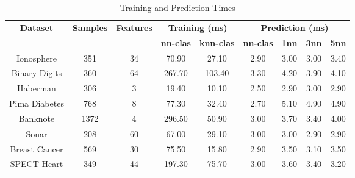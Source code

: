 \begin{table}[H]
\centering
\begin{tabular}{|c|c|c|c|c|c|c|c|c|}
\hline
\multirow{2}{*}{\textbf{Dataset}} & \multirow{2}{*}{\textbf{Samples}} & \multirow{2}{*}{\textbf{Features}} & \multicolumn{2}{c|}{\textbf{Training (ms)}} & \multicolumn{4}{c|}{\textbf{Prediction (ms)}} \\ \cline{4-9}
 & & & \textbf{nn-clas} & \textbf{knn-clas} & \textbf{nn-clas} & \textbf{1nn} & \textbf{3nn} & \textbf{5nn} \\ \hline
Ionosphere & 351 & 34 & 70.90 & 27.10 & 2.90 & 3.00 & 3.00 & 3.40 \\ \hline
Binary Digits & 360 & 64 & 267.70 & 103.40 & 3.30 & 4.20 & 3.90 & 4.10 \\ \hline
Haberman & 306 & 3 & 19.40 & 10.10 & 2.50 & 2.90 & 3.00 & 2.90 \\ \hline
Pima Diabetes & 768 & 8 & 77.30 & 32.40 & 2.70 & 5.10 & 4.90 & 4.90 \\ \hline
Banknote & 1372 & 4 & 296.50 & 50.90 & 3.00 & 3.70 & 3.40 & 4.00 \\ \hline
Sonar & 208 & 60 & 67.00 & 29.10 & 3.00 & 3.00 & 2.90 & 2.90 \\ \hline
Breast Cancer & 569 & 30 & 75.50 & 15.80 & 2.90 & 3.50 & 3.10 & 3.50 \\ \hline
SPECT Heart & 349 & 44 & 197.30 & 75.70 & 3.00 & 3.60 & 3.40 & 3.20 \\ \hline
\end{tabular}
\caption{Training and Prediction Times}
\label{tab:timing}
\end{table}